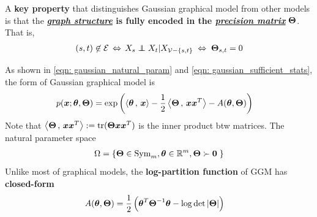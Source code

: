 \documentclass[11pt]{article}
\begin{document}
A \textbf{key property} that distinguishes Gaussian graphical model from other models is that the \textbf{\underline{\emph{graph structure}} is fully encoded in the \underline{\emph{precision matrix}}} $\boldsymbol{\Theta}$. That is, 
\begin{align}
(s,t) \not\in \cE\, \Leftrightarrow \,X_s \indep X_t | X_{\cV-\{s,t\}}\; \Leftrightarrow \; \mb{\Theta}_{s,t} = 0 \label{eqn: gaussian_cond_indep_precision}
\end{align}

 As shown in \eqref{eqn: gaussian_natural_param} and \eqref{eqn: gaussian_sufficient_stats},  the form of Gaussian graphical model is
\begin{align}
 p(\boldsymbol{x}; \boldsymbol{\theta}, \boldsymbol{\Theta}) &= \exp\left(\left\langle \boldsymbol{\theta}\,,\, \boldsymbol{x} \right\rangle - \frac{1}{2}\left\langle \boldsymbol{\Theta}\,,\, \boldsymbol{x}\boldsymbol{x}^{T} \right\rangle - A(\boldsymbol{\theta}, \boldsymbol{\Theta})\right) \label{eqn: ggm_exp}
\end{align} Note that $\left\langle \boldsymbol{\Theta}\,,\, \boldsymbol{x}\boldsymbol{x}^{T} \right\rangle := \text{tr}(\boldsymbol{\Theta}\boldsymbol{x}\boldsymbol{x}^{T})$ is the inner product btw matrices. The natural parameter space 
\begin{align}
\Omega = \left\{\boldsymbol{\Theta} \in \text{Sym}_{m}, \boldsymbol{\theta} \in {\mathbb R}^{m},    \boldsymbol{\Theta} \succ \boldsymbol{0}\;  \right\}
\end{align}
Unlike most of graphical models,  the \textbf{log-partition function} of GGM has \textbf{closed-form}
\begin{align}
A(\boldsymbol{\theta}, \boldsymbol{\Theta}) &= \frac{1}{2}\left(\boldsymbol{\theta}^{T}\boldsymbol{\Theta}^{-1}\boldsymbol{\theta} - \log \det\left\lvert \boldsymbol{\Theta} \right\rvert\right)
\end{align} 
\end{document}
